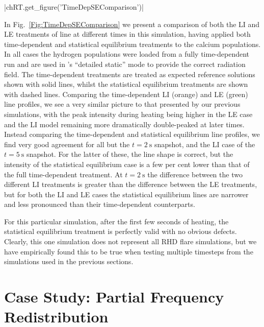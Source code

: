 \py[TimeDepRT]|chRT.get_figure('TimeDepSEComparison')|

In Fig.~\ref{Fig:TimeDepSEComparison} we present a comparison of both the LI and LE treatments of \CaLine{} line at different times in this simulation, having applied both time-dependent and statistical equilibrium treatments to the calcium populations.
In all cases the hydrogen populations were loaded from a fully time-dependent run and are used in \Lw{}'s ``detailed static'' mode to provide the correct radiation field.
The time-dependent treatments are treated as expected reference solutions shown with solid lines, whilst the statistical equilibrium treatments are shown with dashed lines.
Comparing the time-dependent LI (orange) and LE (green) line profiles, we see a very similar picture to that presented by our previous simulations, with the peak intensity during heating being higher in the LE case and the LI model remaining more dramatically double-peaked at later times.
Instead comparing the time-dependent and statistical equilibrium line profiles, we find very good agreement for all but the $t=\SI{2}{\second}$ snapshot, and the LI case of the $t=\SI{5}{\second}$ snapshot.
For the latter of these, the line shape is correct, but the intensity of the statistical equilibrium case is a few per cent lower than that of the full time-dependent treatment.
At $t=\SI{2}{\second}$ the difference between the two different LI treatments is greater than the difference between the LE treatments, but for both the LI and LE cases the statistical equilibrium lines are narrower and less pronounced than their time-dependent counterparts.

For this particular simulation, after the first few seconds of heating, the statistical equilibrium treatment is perfectly valid with no obvious defects.
Clearly, this one simulation does not represent all RHD flare simulations, but we have empirically found this to be true when testing multiple timesteps from the simulations used in the previous sections.


\section{Case Study: Partial Frequency Redistribution}\label{Sec:TimeDepPrd}

